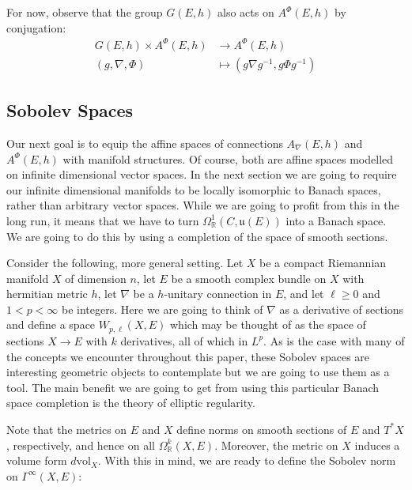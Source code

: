 \documentclass[12pt]{ociamthesis}  %
\begin{document}
For now, observe that the group $G(E,h)$ also acts on $A^\Phi (E,h)$
by conjugation:
\begin{align*}
  G(E,h) \times A^\Phi (E,h) & \to A^\Phi (E,h)                        \\
  (g,\nabla,\Phi)            & \mapsto (g\nabla{g}^{-1},g\Phi{g}^{-1})
\end{align*}


\subsection{Sobolev Spaces}

Our next goal is to equip the affine spaces of connections $A_\nabla(E,h)$
and $A^\Phi (E,h)$ with manifold structures. Of course, both are affine
spaces modelled on infinite dimensional vector spaces. In the next
section we are going to require our infinite dimensional manifolds to
be locally isomorphic to Banach spaces, rather than arbitrary
vector spaces. While we are going to profit from this in the long run,
it means that we have to turn $\Omega^1_{\mathbb{R}}(C,\mathfrak u(E))$
into a Banach space. We are going to do this by using a completion of
the space of smooth sections.

Consider the following, more general setting. Let $X$ be a compact
Riemannian manifold $X$ of dimension $n$, let $E$ be a smooth complex
bundle on $X$ with hermitian metric $h$, let $\nabla$ be a $h$-unitary
connection in $E$, and let $\ell\geq 0$ and $1<p<\infty$ be integers.
Here we are going to think of $\nabla$ as a derivative of sections and
define a space $W_{p,\ell}(X,E)$ which may be thought of as the space of
sections $X\to E$ with $k$ derivatives, all of which in $L^p$. As
is the case with many of the concepts we encounter throughout this paper,
these Sobolev spaces are interesting geometric objects to
contemplate but we are going to use them as a tool. The main
benefit we are going to get from using this particular Banach space
completion is the theory of elliptic regularity. \missingcitation

Note that the metrics on $E$ and $X$ define norms on smooth sections
of $E$ and $T^*X$, respectively, and hence on all
$\Omega^k_{\mathbb{R}}(X,E)$.
Moreover, the metric on $X$ induces a volume form $d\text{vol}_X$.
With this in mind, we are ready to define the Sobolev norm on
$\Gamma^\infty(X,E)$:
\end{document}
